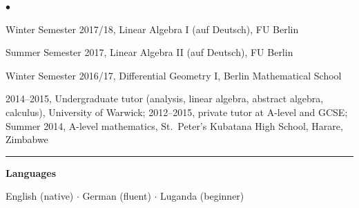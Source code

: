 \documentclass[10pt]{article}
\newcommand{\cvsection}[1]{%
  \par\vspace{0.24cm}%
  \noindent\rule{\textwidth}{0.4pt}%
  \par\vspace{0.12cm}%
  \noindent\textbf{\large #1}%
  \par\vspace{0.12cm}%
}
\newenvironment{cvlist}%
  {\begin{list}{$\bullet$}{%
     \setlength{\leftmargin}{1.1em}\setlength{\labelwidth}{0.8em}%
     \setlength{\itemsep}{0.12cm}\setlength{\parsep}{0pt}%
     \setlength{\topsep}{0pt}\setlength{\partopsep}{0pt}}}%
  {\end{list}}
\begin{document}
\begin{cvlist}
\item Winter Semester 2017/18, Linear Algebra I (auf Deutsch), FU Berlin
\item Summer Semester 2017, Linear Algebra II (auf Deutsch), FU Berlin
\item Winter Semester 2016/17, Differential Geometry I, Berlin Mathematical School
\item 2014--2015, Undergraduate tutor (analysis, linear algebra, abstract
algebra, calculus), University of Warwick; 2012--2015, private tutor at
A-level and GCSE; Summer 2014, A-level mathematics, St.\ Peter's Kubatana
High School, Harare, Zimbabwe
\end{cvlist}

\cvsection{Languages}
English (native) \quad $\cdot$ \quad German (fluent) \quad $\cdot$ \quad Luganda (beginner)
\end{document}
